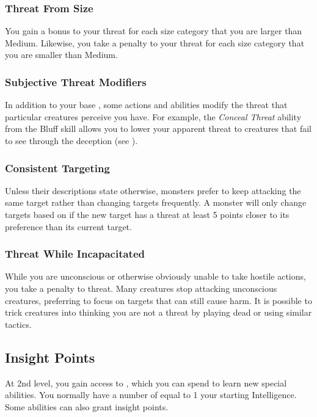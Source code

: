         \subsubsection{Threat From Size}
            You gain a  bonus to your threat for each size category that you are larger than Medium.
            Likewise, you take a  penalty to your threat for each size category that you are smaller than Medium.

        \subsubsection{Subjective Threat Modifiers}
            In addition to your base , some actions and abilities modify the threat that particular creatures perceive you have.
            For example, the \textit{Conceal Threat} ability from the Bluff skill allows you to lower your apparent threat to creatures that fail to see through the deception (see ).

        \subsubsection{Consistent Targeting}
            Unless their descriptions state otherwise, monsters prefer to keep attacking the same target rather than changing targets frequently.
            A monster will only change targets based on  if the new target has a threat at least 5 points closer to its preference than its current target.

        \subsubsection{Threat While Incapacitated}
            While you are unconscious or otherwise obviously unable to take hostile actions, you take a  penalty to threat.
            Many creatures stop attacking unconscious creatures, preferring to focus on targets that can still cause harm.
            It is possible to trick creatures into thinking you are not a threat by playing dead or using similar tactics.

    \subsection{Insight Points}\label{Insight Points}
        At 2nd level, you gain access to , which you can spend to learn new special abilities.
        You normally have a number of  equal to 1 \add your starting Intelligence.
        Some abilities can also grant insight points.

